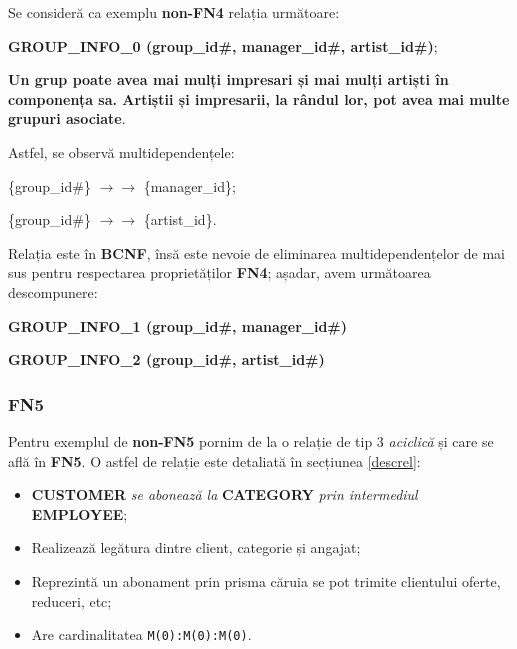 \documentclass[a4paper, oneside, 12pt]{article}
\begin{document}
Se consideră ca exemplu \textbf{non-FN4} relația următoare:

\begin{m_itemize}[after=]
        \item \textbf{GROUP\_INFO\_0 (group\_id\#, manager\_id\#, artist\_id\#)};
        \item \textbf{Un grup poate avea mai mulți impresari și mai mulți
              artiști în componența sa. Artiștii și impresarii, la rândul
              lor, pot avea mai multe grupuri asociate}.
\end{m_itemize}


\medskip

Astfel, se observă multidependențele:

\begin{m_itemize}
        \item \{group\_id\#\} $\rightarrow\rightarrow$ \{manager\_id\};
        \item \{group\_id\#\} $\rightarrow\rightarrow$ \{artist\_id\}.
\end{m_itemize}

Relația este în \textbf{BCNF}, însă este nevoie de eliminarea
multidependențelor de mai sus pentru respectarea proprietăților \textbf{FN4};
așadar, avem următoarea descompunere:

\begin{m_itemize}
        \item \textbf{GROUP\_INFO\_1 (group\_id\#, manager\_id\#)}
        \item \textbf{GROUP\_INFO\_2 (group\_id\#, artist\_id\#)}
\end{m_itemize}

\subsubsection{\textbf{FN5}}

Pentru exemplul de \textbf{non-FN5} pornim de la o relație de tip 3
\emph{aciclică} și care se află în \textbf{FN5}. O astfel de relație este
detaliată în secțiunea \ref{descrel}:

\begin{itemize}[label=\textbullet, noitemsep, topsep=0pt, after=]

\item \textbf{CUSTOMER} \emph{se abonează la} \textbf{CATEGORY} \emph{prin intermediul} \textbf{EMPLOYEE};
      \item Realizează legătura dintre client, categorie și angajat;
      \item Reprezintă un abonament prin prisma căruia se pot trimite clientului oferte, reduceri, etc;
      \item Are cardinalitatea \texttt{M(0):M(0):M(0)}.

\end{itemize}
\end{document}
